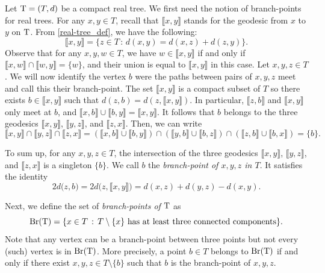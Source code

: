 \documentclass[11pt,reqno]{amsart}
\begin{document}
Let $\mathrm{T}=(T,d)$ be a compact real tree. We first need the notion of branch-points for real trees. For any $x,y\in T$, recall that $\llbracket x,y\rrbracket$ stands for the geodesic from $x$ to $y$ on $\mathrm{T}$. From \cref{real-tree_def}, we have the following:
\begin{equation}
\label{geo_distance}
\llbracket x,y\rrbracket=\{z\in T\, :\, d(x,y)=d(x,z)+d(z,y)\}.
\end{equation}
Observe that for any $x,y,w\in T$, we have $w\in\llbracket x,y\rrbracket$ if and only if $\llbracket x,w\rrbracket \cap \llbracket w,y\rrbracket = \{w\}$, and their union is equal to $\llbracket x,y\rrbracket$ in this case.
Let $x,y,z\in T$. We will now identify the vertex $b$ were the paths between pairs of $x,y,z$ meet and call this their branch-point. The set $\llbracket x,y\rrbracket$ is a compact subset of $T$ so there exists $b\in \llbracket x,y\rrbracket$ such that $d(z,b)=d(z,\llbracket x,y\rrbracket)$. In particular, $\llbracket z,b\rrbracket$ and $\llbracket x,y\rrbracket$ only meet at $b$, and $\llbracket x,b\rrbracket\cup\llbracket b,y\rrbracket=\llbracket x,y\rrbracket$. It follows that $b$ belongs to the three geodesics $\llbracket x,y\rrbracket$, $\llbracket y,z\rrbracket$, and $\llbracket z,x\rrbracket$. Then, we can write
\[\llbracket x,y\rrbracket\cap \llbracket y,z \rrbracket \cap\llbracket z,x\rrbracket=(\llbracket x,b\rrbracket\cup \llbracket b,y\rrbracket)\cap (\llbracket y,b\rrbracket\cup \llbracket b,z\rrbracket) \cap (\llbracket z,b\rrbracket\cup \llbracket b,x\rrbracket)=\{b\}.\]

To sum up, for any $x,y,z\in T$, the intersection of the three geodesics $\llbracket x,y\rrbracket$, $\llbracket y,z\rrbracket$, and $\llbracket z,x\rrbracket$ is a singleton $\{b\}$. We call $b$ the \emph{branch-point of $x,y,z$ in $T$}. It satisfies the identity
\begin{equation}
\label{distance-to-branch-point}
2d\big(z,b\big)=2d\big(z,\llbracket x,y\rrbracket\big)=d(x,z)+d(y,z)-d(x,y).
\end{equation}

Next, we define the set of \emph{branch-points of $\mathrm{T}$} as 
\[\mathrm{Br}(\mathrm{T})=\{x\in T\, :\, T\setminus\{x\}\text{ has at least three connected components}\}.\]
Note that any vertex can be a branch-point between three points but not every (such) vertex is in $\mathrm{Br}(\mathrm{T})$. More precisely, a point $b\in T$ belongs to $\mathrm{Br}(\mathrm{T})$ if and only if there exist $x,y,z\in T\setminus\{b\}$ such that $b$ is the branch-point of $x,y,z$.
\smallskip
\end{document}
